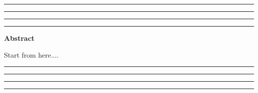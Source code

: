 \thispagestyle{empty}
\hrule\hrule\hrule\hrule %
\begin{center}
\textbf{\large Abstract}
\\
\end{center}

Start from here....


\vfill
\hrule\hrule\hrule\hrule
\clearpage